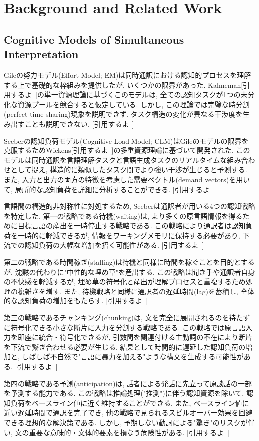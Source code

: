 \section{Background and Related Work}

\subsection{Cognitive Models of Simultaneous Interpretation}

Gileの努力モデル(Effort Model; EM)は同時通訳における認知的プロセスを理解する上で基礎的な枠組みを提供したが, いくつかの限界があった.
Kahneman[引用するよ~]の単一資源理論に基づくこのモデルは, 全ての認知タスクが1つの未分化な資源プールを競合すると仮定している.
しかし, この理論では完璧な時分割(perfect time-sharing)現象を説明できず, タスク構造の変化が異なる干渉度を生み出すことも説明できない.
[引用するよ~]

Seeberの認知負荷モデル(Cognitive Load Model; CLM)はGileのモデルの限界を克服するためWickens[引用するよ~]の多重資源理論に基づいて開発された.
このモデルは同時通訳を言語理解タスクと言語生成タスクのリアルタイムな組み合わせとして捉え, 構造的に類似したタスク間でより強い干渉が生じると予測する.
また, 入力と出力の両方の特徴を考慮した需要ベクトル(demand vectors)を用いて, 局所的な認知負荷を詳細に分析することができる.
[引用するよ~]

言語間の構造的非対称性に対処するため, Seeberは通訳者が用いる4つの認知戦略を特定した.
第一の戦略である待機(waiting)は, より多くの原言語情報を得るために目標言語の産出を一時停止する戦略である.
この戦略により通訳者は認知負荷を一時的に軽減できるが, 情報をワーキングメモリに保持する必要があり, 下流での認知負荷の大幅な増加を招く可能性がある.
[引用するよ~]

第二の戦略である時間稼ぎ(stalling)は待機と同様に時間を稼ぐことを目的とするが, 沈黙の代わりに"中性的な埋め草"を産出する.
この戦略は聞き手や通訳者自身の不快感を軽減するが, 埋め草の符号化と産出が理解プロセスと重複するため処理の複雑さを増す.
また, 待機戦略と同様に通訳者の遅延時間(lag)を蓄積し, 全体的な認知負荷の増加をもたらす.
[引用するよ~]

第三の戦略であるチャンキング(chunking)は, 文を完全に展開されるのを待たずに符号化できる小さな断片に入力を分割する戦略である.
この戦略では原言語入力を即座に統合・符号化できるが, 引数間を関連付ける主動詞の不在により断片を下流で繋ぎ合わせる必要が生じる.
結果として時間的に遅延した認知負荷の増加と, しばしば不自然で"言語に暴力を加える"ような構文を生成する可能性がある.
[引用するよ~]

第四の戦略である予測(anticipation)は, 話者による発話に先立って原談話の一部を予測する能力である.
この戦略は推論処理("推測")に伴う認知資源を除いて, 認知負荷をベースライン値に近く維持することができる.
また, ベースライン値に近い遅延時間で通訳を完了でき, 他の戦略で見られるスピルオーバー効果を回避できる理想的な解決策である.
しかし, 予期しない動詞による"驚き"のリスクが伴い, 文の重要な意味的・文体的要素を損なう危険性がある.
[引用するよ~]


